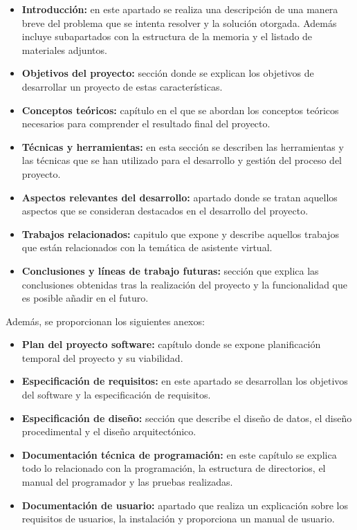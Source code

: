 \begin{itemize}
	\tightlist
	\item
	\textbf{Introducción:} en este apartado se realiza una descripción de una manera breve del problema que se intenta resolver y la solución otorgada. Además incluye subapartados con la estructura de la memoria y el listado de materiales adjuntos.
	\item
	\textbf{Objetivos del proyecto:} sección donde se explican los objetivos de desarrollar un proyecto de estas características.
	\item
	\textbf{Conceptos teóricos:} capítulo en el que se abordan los conceptos teóricos necesarios para comprender el resultado final del proyecto.
	\item
	\textbf{Técnicas y herramientas:} en esta sección se describen las herramientas y las técnicas que se han utilizado para el desarrollo y gestión del proceso del proyecto.
	\item
	\textbf{Aspectos relevantes del desarrollo:} apartado donde se tratan aquellos aspectos que se consideran destacados en el desarrollo del proyecto.
	\item
	\textbf{Trabajos relacionados:} capitulo que expone y describe aquellos trabajos que están relacionados con la temática de asistente virtual.
	\item
	\textbf{Conclusiones y líneas de trabajo futuras:} sección que explica las conclusiones obtenidas tras la realización del proyecto y la funcionalidad que es posible añadir en el futuro.
\end{itemize}

Además, se proporcionan los siguientes anexos:

\begin{itemize}
	\tightlist
	\item
	\textbf{Plan del proyecto software:} capítulo donde se expone planificación temporal del proyecto y su viabilidad.
	\item
	\textbf{Especificación de requisitos:} en este apartado se desarrollan los objetivos del software y la especificación de requisitos.
	\item
	\textbf{Especificación de diseño:} sección que describe el diseño de datos, el diseño procedimental y el diseño arquitectónico.
	\item
	\textbf{Documentación técnica de programación:} en este capítulo se explica todo lo relacionado con la programación, la estructura de directorios, el manual del programador y las pruebas realizadas.
	\item
	\textbf{Documentación de usuario:} apartado que realiza un explicación sobre los requisitos de usuarios, la instalación y proporciona un manual de usuario.
\end{itemize}

